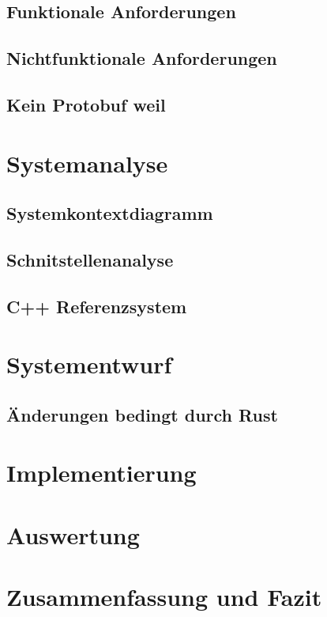 \documentclass[11pt]{scrartcl}
\begin{document}
		\subsection{Funktionale Anforderungen}
		\subsection{Nichtfunktionale Anforderungen}
		\subsection{Kein Protobuf weil}
	
	\section{Systemanalyse}
		\subsection{Systemkontextdiagramm}
		\subsection{Schnitstellenanalyse}
		\subsection{C++ Referenzsystem}
		
	\section{Systementwurf}
		\subsection{Änderungen bedingt durch Rust}
	
	\section{Implementierung}
	\section{Auswertung}
	\section{Zusammenfassung und Fazit}
	
	
	
	
	\clearpage
	\printbibliography
	
	\clearpage
	\printglossaries

	\clearpage
	\listoffigures
	
	
\end{document}
